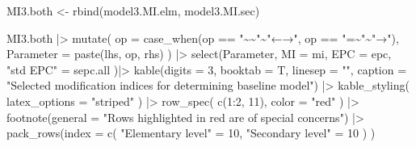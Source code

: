 \documentclass[
]{article}
\newenvironment{Shaded}{\begin{snugshade}}{\end{snugshade}}
\newcommand{\AttributeTok}[1]{\textcolor[rgb]{0.77,0.63,0.00}{#1}}
\newcommand{\DecValTok}[1]{\textcolor[rgb]{0.00,0.00,0.81}{#1}}
\newcommand{\FunctionTok}[1]{\textcolor[rgb]{0.00,0.00,0.00}{#1}}
\newcommand{\NormalTok}[1]{#1}
\newcommand{\OtherTok}[1]{\textcolor[rgb]{0.56,0.35,0.01}{#1}}
\newcommand{\SpecialCharTok}[1]{\textcolor[rgb]{0.00,0.00,0.00}{#1}}
\newcommand{\StringTok}[1]{\textcolor[rgb]{0.31,0.60,0.02}{#1}}
\begin{document}
\begin{Shaded}
\begin{Highlighting}[]
\NormalTok{MI3.both }\OtherTok{\textless{}{-}} \FunctionTok{rbind}\NormalTok{(model3.MI.elm, model3.MI.sec)}

\NormalTok{MI3.both    }\SpecialCharTok{|\textgreater{}} 
  \FunctionTok{mutate}\NormalTok{(}
    \AttributeTok{op =} \FunctionTok{case\_when}\NormalTok{(op }\SpecialCharTok{==} \StringTok{"\textasciitilde{}\textasciitilde{}"}\SpecialCharTok{\textasciitilde{}}\StringTok{"←→"}\NormalTok{,}
\NormalTok{                   op }\SpecialCharTok{==} \StringTok{"=\textasciitilde{}"}\SpecialCharTok{\textasciitilde{}}\StringTok{"→"}\NormalTok{), }
    \AttributeTok{Parameter =} 
           \FunctionTok{paste}\NormalTok{(lhs, op, rhs)}
\NormalTok{         ) }\SpecialCharTok{|\textgreater{}}
  \FunctionTok{select}\NormalTok{(Parameter, }
         \AttributeTok{MI =}\NormalTok{ mi, }
         \AttributeTok{EPC =}\NormalTok{ epc, }
         \StringTok{"std EPC"} \OtherTok{=}\NormalTok{ sepc.all}
\NormalTok{         )}\SpecialCharTok{|\textgreater{}}
  \FunctionTok{kable}\NormalTok{(}\AttributeTok{digits =} \DecValTok{3}\NormalTok{,}
        \AttributeTok{booktab =}\NormalTok{ T,}
        \AttributeTok{linesep =} \StringTok{""}\NormalTok{,}
        \AttributeTok{caption =} 
          \StringTok{"Selected modification indices for determining baseline model"}\NormalTok{) }\SpecialCharTok{|\textgreater{}}
  \FunctionTok{kable\_styling}\NormalTok{(}
    \AttributeTok{latex\_options =} \StringTok{"striped"}
\NormalTok{    ) }\SpecialCharTok{|\textgreater{}}
  \FunctionTok{row\_spec}\NormalTok{(}
    \FunctionTok{c}\NormalTok{(}\DecValTok{1}\SpecialCharTok{:}\DecValTok{2}\NormalTok{, }\DecValTok{11}\NormalTok{), }
    \AttributeTok{color =} \StringTok{"red"}
\NormalTok{    ) }\SpecialCharTok{|\textgreater{}} 
  \FunctionTok{footnote}\NormalTok{(}\AttributeTok{general =} 
             \StringTok{"Rows highlighted in red are of special concerns"}\NormalTok{) }\SpecialCharTok{|\textgreater{}} 
  \FunctionTok{pack\_rows}\NormalTok{(}\AttributeTok{index =} \FunctionTok{c}\NormalTok{(}
    \StringTok{"Elementary level"} \OtherTok{=} \DecValTok{10}\NormalTok{,}
    \StringTok{"Secondary level"} \OtherTok{=} \DecValTok{10}
\NormalTok{    )}
\NormalTok{    )}
\end{Highlighting}
\end{Shaded}
\end{document}
